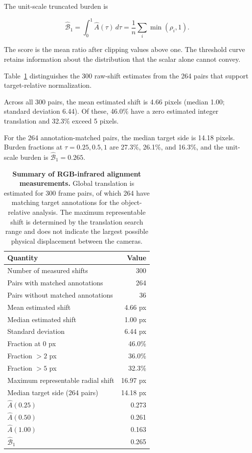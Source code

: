 \documentclass[10pt]{article}
\begin{document}
The unit-scale truncated burden is

\begin{equation}
\widehat{\mathcal B}_{1}
=
\int_0^1
\widehat A(\tau)\,d\tau
=
\frac{1}{n}
\sum_i
\min(\rho_i,1).
\end{equation}

The score is the mean ratio after clipping values above one. The threshold curve retains information about the distribution that the scalar alone cannot convey.

Table~\ref{tab:alignsummary} distinguishes the 300 raw-shift estimates from the 264 pairs that support target-relative normalization.

Across all 300 pairs, the mean estimated shift is 4.66 pixels (median 1.00; standard deviation 6.44). Of these, 46.0\% have a zero estimated integer translation and 32.3\% exceed 5 pixels.

For the 264 annotation-matched pairs, the median target side is 14.18 pixels. Burden fractions at $\tau=0.25,0.5,1$ are 27.3\%, 26.1\%, and 16.3\%, and the unit-scale burden is $\widehat{\mathcal B}_1=0.265$.

\begin{table}[h]
\centering
\caption{\textbf{Summary of RGB-infrared alignment measurements.}
Global translation is estimated for 300 frame pairs, of which 264 have matching target annotations for the object-relative analysis. The maximum representable shift is determined by the translation search range and does not indicate the largest possible physical displacement between the cameras.}
\label{tab:alignsummary}
\small
\begin{tabular}{lr}
\toprule
Quantity & Value \\
\midrule
Number of measured shifts & 300 \\
Pairs with matched annotations & 264 \\
Pairs without matched annotations & 36 \\
Mean estimated shift & 4.66 px \\
Median estimated shift & 1.00 px \\
Standard deviation & 6.44 px \\
Fraction at 0 px & 46.0\% \\
Fraction $>2$ px & 36.0\% \\
Fraction $>5$ px & 32.3\% \\
Maximum representable radial shift & 16.97 px \\
Median target side (264 pairs) & 14.18 px \\
$\widehat A(0.25)$ & 0.273 \\
$\widehat A(0.50)$ & 0.261 \\
$\widehat A(1.00)$ & 0.163 \\
$\widehat{\mathcal B}_{1}$ & 0.265 \\
\bottomrule
\end{tabular}
\end{table}
\end{document}
